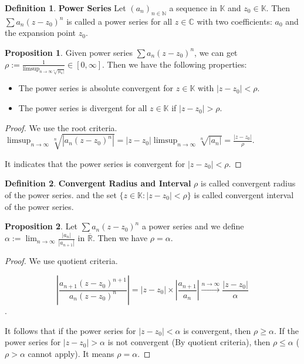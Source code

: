 \documentclass{article}
\theoremstyle{definition}
\newtheorem{defi}{Definition}[subsection]
\newtheorem{prop}{Proposition}[subsection]
\begin{document}
\begin{defi}
\textbf{Power Series} Let $(a_n)_{n\in\mathbb{N}}$ a sequence in $\mathbb{K}$ and $z_0\in\mathbb{K}$. Then $\sum a_n(z-z_0)^n$ is called a power series for all $z\in\mathbb{C}$ with two coefficients: $a_0$ and the expansion point $z_0$.
\end{defi}

\begin{prop}
Given power series $\sum a_n(z-z_0)^{n}$, we can get $\rho := \frac{1}{\limsup_{n\to\infty \sqrt[n]{|a_n|}}}\in[0,\infty]$. Then we have the following properties:
\begin{itemize}
    \item The power series is absolute convergent for $z\in\mathbb{K}$ with $|z-z_0|<\rho$.
    \item The power series is divergent for all $z\in\mathbb{K}$ if $|z-z_0|>\rho$.
\end{itemize}
\begin{proof}
We use the root criteria. $\limsup_{n\to\infty}\sqrt[n]{|a_n(z-z_0)^n|}=|z-z_0|\limsup_{n\to\infty}\sqrt[n]{|a_n|}=\frac{|z-z_0|}{\rho}$.

It indicates that the power series is convergent for $|z-z_0|<\rho$.
\end{proof}
\end{prop}

\begin{defi}
\textbf{Convergent Radius and Interval} $\rho$ is called convergent radius of the power series. and the set $\{z\in\mathbb{K}: |z-z_0|<\rho\}$ is called convergent interval of the power series.
\end{defi}

\begin{prop}
Let $\sum a_n (z-z_0)^n$ a power series and we define $\alpha := \lim_{n\to\infty}\frac{|a_n|}{|a_{n+1}|}$ in $\overline{\mathbb{R}}$. Then we have $\rho=\alpha$.
\begin{proof}
We use quotient criteria.

$$|\frac{a_{n+1}(z-z_0)^{n+1}}{a_n(z-z_0)^{n}}| = |z-z_0|\times |\frac{a_{n+1}}{a_n}|\xrightarrow{n\to\infty} \frac{|z-z_0|}{\alpha}$$.

It follows that if the power series for $|z-z_0|<\alpha$ is convergent, then $\rho\geq \alpha$. If the power series for $|z-z_0|>\alpha$ is not convergent (By quotient criteria), then $\rho\leq \alpha$ ($\rho>\alpha$ cannot apply). It means $\rho=\alpha$. 
\end{proof}
\end{prop}
\end{document}
